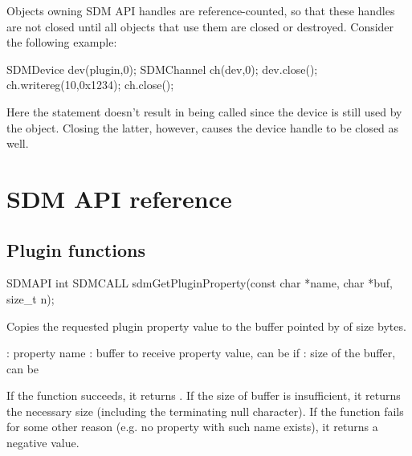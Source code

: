 \documentclass[a4paper,12pt,twoside,extrafontsizes]{memoir}
\begin{document}
Objects owning SDM API handles are reference-counted, so that these handles are not closed until all objects that use them are closed or destroyed. Consider the following example:

\begin{breakshellcmds}\begin{ccode}
SDMDevice dev(plugin,0);
SDMChannel ch(dev,0);
dev.close();
ch.writereg(10,0x1234);
ch.close();
\end{ccode}\end{breakshellcmds}

Here the  statement doesn't result in  being called since the device is still used by the  object. Closing the latter, however, causes the device handle to be closed as well.

\chapter{SDM API reference}
\label{ch:sdmapireference}

\section{Plugin functions}



\begin{cfuncprototype}
SDMAPI int SDMCALL sdmGetPluginProperty(const char *name, char *buf, size_t n);
\end{cfuncprototype}

\begin{funcdescr}
	Copies the requested plugin property value to the buffer pointed by  of size  bytes.
\end{funcdescr}

\begin{funcparams}
	: property name
	: buffer to receive property value, can be  if 
	: size of the buffer, can be 
\end{funcparams}

\begin{funcret}
	If the function succeeds, it returns . If the size of buffer is insufficient, it returns the necessary size (including the terminating null character). If the function fails for some other reason (e.g. no property with such name exists), it returns a negative value.
\end{funcret}
\end{document}
